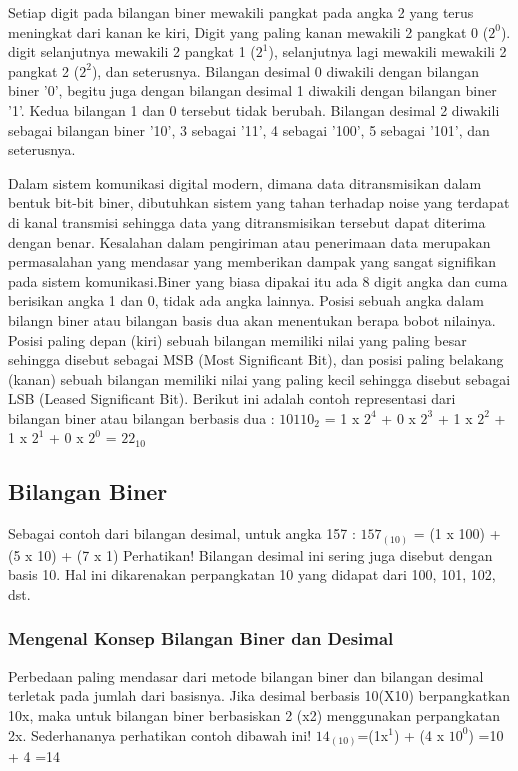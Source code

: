\documentclass{article}
\begin{document}
Setiap digit pada bilangan biner mewakili pangkat pada angka 2 yang terus meningkat dari kanan ke kiri, Digit yang paling kanan mewakili 2 pangkat 0 ($2^0$). digit selanjutnya mewakili 2 pangkat 1 ($2^1$), selanjutnya lagi mewakili mewakili 2 pangkat 2 ($2^2$), dan seterusnya. Bilangan desimal 0 diwakili dengan bilangan biner '0', begitu juga dengan bilangan desimal 1 diwakili dengan bilangan biner '1'. Kedua bilangan 1 dan 0 tersebut tidak berubah. Bilangan desimal 2 diwakili sebagai bilangan biner '10', 3 sebagai '11', 4 sebagai '100', 5 sebagai '101', dan seterusnya.

Dalam sistem komunikasi digital modern, dimana data ditransmisikan dalam bentuk bit-bit biner, dibutuhkan sistem yang tahan terhadap noise yang terdapat di kanal transmisi sehingga data yang ditransmisikan tersebut dapat diterima dengan benar. Kesalahan dalam pengiriman atau penerimaan data merupakan permasalahan yang mendasar yang memberikan dampak yang sangat signifikan pada sistem komunikasi.Biner yang biasa dipakai itu ada 8 digit angka dan cuma berisikan angka 1 dan 0, tidak ada angka lainnya.
Posisi sebuah angka dalam bilangn biner atau bilangan basis dua akan menentukan berapa bobot nilainya. Posisi paling depan (kiri) sebuah bilangan memiliki nilai yang paling besar sehingga disebut sebagai MSB (Most Significant Bit), dan posisi paling belakang (kanan) sebuah bilangan memiliki nilai yang paling kecil sehingga disebut sebagai LSB (Leased Significant Bit). Berikut ini adalah contoh representasi dari bilangan biner atau bilangan berbasis dua : 
$10110_2$ = 1 x $2^4$ + 0 x $2^3$ + 1 x $2^2$ + 1 x $2^1$ + 0 x $2^0$ = $22_{10}$

\subsection{Bilangan Biner}
Sebagai contoh dari bilangan desimal, untuk angka 157 : $157_{(10)}$ = (1 x 100) + (5 x 10) + (7 x 1) 
Perhatikan! Bilangan desimal ini sering juga disebut dengan basis 10. Hal ini dikarenakan perpangkatan 10 yang didapat dari 100, 101, 102, dst. 

\subsubsection{Mengenal Konsep Bilangan Biner dan Desimal}
Perbedaan paling mendasar dari metode bilangan biner dan bilangan desimal terletak pada jumlah dari basisnya. Jika desimal berbasis 10(X10) berpangkatkan 10x, maka untuk bilangan biner berbasiskan 2 (x2) menggunakan perpangkatan 2x. Sederhananya perhatikan contoh dibawah ini!
$14_{(10)}$=(1x$^1$) + (4 x $10^0$)
=10 + 4
=14
\end{document}
